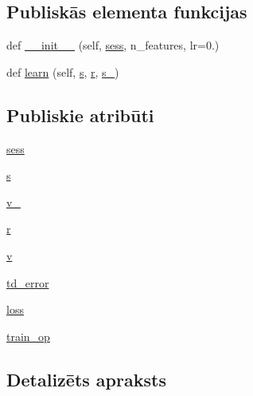 \subsection*{Publiskās elementa funkcijas}
\begin{DoxyCompactItemize}
\item 
def \hyperlink{classddpg__others_1_1_critic_ad79f6a3961bf9da84b50feb690f72708}{\+\_\+\+\_\+init\+\_\+\+\_\+} (self, \hyperlink{classddpg__others_1_1_critic_ab0c8a33f283df68173a93990084034de}{sess}, n\+\_\+features, lr=0.)
\item 
def \hyperlink{classddpg__others_1_1_critic_aa108c309d56a4e946e76908168a97cdf}{learn} (self, \hyperlink{classddpg__others_1_1_critic_a6d70d80341ad76c8c12ddaf0e06e513a}{s}, \hyperlink{classddpg__others_1_1_critic_a127f5c9ec25bd223417b5f478bc2a11f}{r}, \hyperlink{namespaceddpg__others_a9401d5decfd243fdd11c64d512501ff1}{s\+\_\+})
\end{DoxyCompactItemize}
\subsection*{Publiskie atribūti}
\begin{DoxyCompactItemize}
\item 
\hyperlink{classddpg__others_1_1_critic_ab0c8a33f283df68173a93990084034de}{sess}
\item 
\hyperlink{classddpg__others_1_1_critic_a6d70d80341ad76c8c12ddaf0e06e513a}{s}
\item 
\hyperlink{classddpg__others_1_1_critic_a44cb021fd77cfeb1515d1421ea1135cd}{v\+\_\+}
\item 
\hyperlink{classddpg__others_1_1_critic_a127f5c9ec25bd223417b5f478bc2a11f}{r}
\item 
\hyperlink{classddpg__others_1_1_critic_a4ea207b84e027e537185c3067f21e8fd}{v}
\item 
\hyperlink{classddpg__others_1_1_critic_acd08db4e575e41c9b40c89aeb70b69fc}{td\+\_\+error}
\item 
\hyperlink{classddpg__others_1_1_critic_a234f0de11677fd4cc6b2387173ed5065}{loss}
\item 
\hyperlink{classddpg__others_1_1_critic_a3c9fc0fa915bdd1c961e8a94b60e486f}{train\+\_\+op}
\end{DoxyCompactItemize}


\subsection{Detalizēts apraksts}


